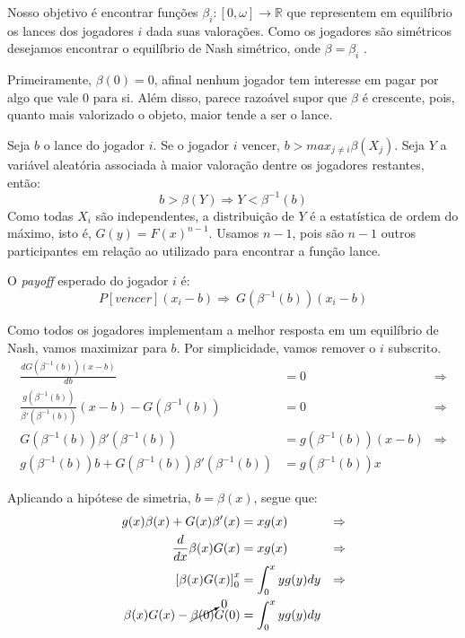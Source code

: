 Nosso objetivo é encontrar funções $\beta_i : [0, \omega] \xrightarrow{} \mathbb{R}$ que representem em equilíbrio os lances dos jogadores $i$ dada suas valorações. Como os jogadores são simétricos desejamos encontrar o equilíbrio de Nash simétrico, onde $\beta = \beta_i$ \citet{krishna}.

Primeiramente, $\beta(0) = 0$, afinal nenhum jogador tem interesse em pagar por algo que vale 0 para si. Além disso, parece razoável supor que $\beta$ é crescente, pois, quanto mais valorizado o objeto, maior tende a ser o lance.

Seja $b$ o lance do jogador $i$. Se o jogador $i$ vencer, $b > max_{j \ne i} \beta(X_j)$. Seja $Y$ a variável aleatória associada à maior valoração dentre os jogadores restantes, então:
\begin{equation}
b > \beta(Y) \Rightarrow Y < \beta^{-1}(b)    
\end{equation}
Como todas $X_i$ são independentes, a distribuição de $Y$ é a estatística de ordem do máximo, isto é, $G(y) = F(x)^{n-1}$. Usamos $n-1$, pois são $n-1$ outros participantes em relação ao utilizado para encontrar a função lance.

O \emph{payoff} esperado do jogador $i$ é:
\begin{equation}
    P[vencer] (x_i - b) \Rightarrow \
    G(\beta^{-1}(b)) (x_i - b)
\end{equation}

Como todos os jogadores implementam a melhor resposta em um equilíbrio de Nash, vamos maximizar para $b$. Por simplicidade, vamos remover o $i$ subscrito.
\begin{align*}
	\frac{d G(\beta^{-1}(b)) (x - b)}{db} & = 0 & \Rightarrow \\
	\frac{ g( \beta^{-1}(b) ) }{ \beta'( \beta^{-1}(b) ) }(x - b) - G( \beta^{-1}(b) ) & = 0 & \Rightarrow \\
	G( \beta^{-1}(b) )\beta'( {\beta^{-1}(b)} ) & = g( \beta^{-1}(b) )(x - b) & \Rightarrow \\
	g(\beta^{-1}(b))b + G(\beta^{-1}(b))\beta'({\beta^{-1}(b)}) & = g(\beta^{-1}(b))x
\end{align*}

Aplicando a hipótese de simetria, $b = \beta(x)$, segue que:
\begin{align*}
	g(x)\beta(x) + G(x)\beta'(x) & = xg(x) & \Rightarrow \\
	\frac{d}{dx} \beta(x)G(x) & = xg(x) & \Rightarrow \\
	\left[ \beta(x)G(x) \right]_{0}^{x} & = \int_{0}^{x} yg(y)dy & \Rightarrow \\
	\beta(x)G(x) - \cancelto{0}{\beta(0)}G(0) & = \int_{0}^{x} yg(y)dy
\end{align*}


